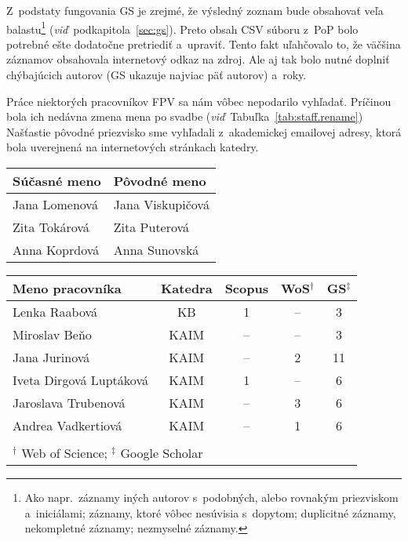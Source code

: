 Z~podstaty fungovania GS je zrejmé, že výsledný zoznam bude obsahovať veľa
balastu\footnote{Ako napr.~záznamy iných autorov s~podobných, alebo rovnakým
  priezviskom a~iniciálami; záznamy, ktoré vôbec nesúvisia s~dopytom; duplicitné
  záznamy, nekompletné záznamy; nezmyselné záznamy.}
(\emph{viď}~podkapitola~\ref{sec:gs}).  Preto obsah CSV súboru z~PoP bolo
potrebné ešte dodatočne pretriediť a~upraviť.  Tento fakt uľahčovalo to, že
väčšina záznamov obsahovala internetový odkaz na zdroj.  Ale aj tak bolo nutné
doplniť chýbajúcich autorov (GS ukazuje najviac päť autorov) a~roky.

Práce niektorých pracovníkov FPV sa nám vôbec nepodarilo vyhľadať.  Príčinou
bola ich nedávna zmena mena po svadbe (\emph{viď}~Tabuľka~\ref{tab:staff.rename})
Našťastie pôvodné priezvisko sme vyhľadali z~akademickej emailovej adresy, ktorá
bola uverejnená na internetových stránkach katedry.

\begin{SCtable}
  \centering\small
  \caption[Mená pracovníkov FPV, u~ktorých došlo k~zmene priezviska]%
  {Zoznam pracovníkov Fakulty prírodných vied UCM v~Trnave, u~ktorých došlo k~zmene
  priezviska.  Pôvodné priezvisko sme vyhľadali z~akademickej emailovej adresy.}
  \label{tab:staff.rename}
  \begin{tabular}{ll}
    \toprule
    Súčasné meno & Pôvodné meno \\
    \midrule
    Jana Lomenová & Jana Viskupičová \\
    Zita Tokárová & Zita Puterová    \\
    Anna Koprdová & Anna Sunovská    \\
    \bottomrule
  \end{tabular}
\end{SCtable}

\begin{SCtable}
  \centering\small
  \caption[Mená pracovníkov FPV, u ktorých sa nám nepodarilo získať všetky dáta]%
  {Zoznam Pracovníkov FPV, pre ktorých sa nepodarilo získať z~niektorých
    citačných registrov žiadne dáta.  V~posledných troch stĺpcoch je uvedený
    počet publikácií, ktoré sa nám podarilo získať.}
  \label{tab:staff.missing}
  \begin{tabular}{lcccc}
    \toprule
    Meno pracovníka & Katedra & Scopus & WoS$^\dagger$ & GS$^\ddagger$ \\
    \midrule
    Lenka Raabová           &  KB  & 1  & --  & 3  \\
    Miroslav Beňo           & KAIM & -- & --  & 3  \\
    Jana Jurinová           & KAIM & -- & 2   & 11 \\
    Iveta Dirgová Luptáková & KAIM & 1  & --  & 6  \\
    Jaroslava Trubenová     & KAIM & -- & 3   & 6  \\
    Andrea Vadkertiová      & KAIM & -- & 1   & 6  \\
    \bottomrule \\[-2ex]
    \multicolumn{5}{l}{\footnotesize $^\dagger$ Web of Science; $^\ddagger$ Google Scholar}
  \end{tabular}
\end{SCtable}


